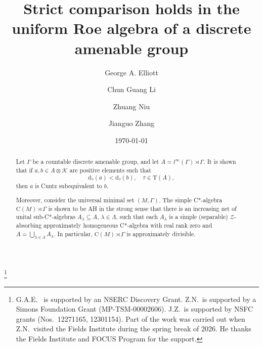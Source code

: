 \documentclass[12pt, oneside, psamsfonts]{amsart}
\theoremstyle{definition}
\theoremstyle{remark}
\numberwithin{equation}{section}
\newcommand{\tr}{\mathrm{T}}
\begin{document}
\title[Strict comparison in uniform Roe algebra]{Strict comparison holds in the uniform Roe algebra of a discrete amenable group}

\author{George A. Elliott}
\address{Department of Mathematics, University of Toronto, Toronto, Ontario, Canada~\ M5S 2E4}

\author{Chun Guang Li}
\address{
School of Mathematics and Statistics, Northeast Normal University, Changchun, 130024, P. R.~China
}

\author{Zhuang Niu}
\address{Department of Mathematics and Statistics, University of Wyoming, Laramie, Wyoming, USA, 82071}

\author{Jianguo Zhang}
\address{
School of Mathematics and Statistics, Shaanxi Normal University, Xi'an, Shaanxi, P. R.~China
}

\thanks{G.A.E.~ is supported by an NSERC Discovery Grant. Z.N.~is supported by a Simons Foundation Grant (MP-TSM-00002606). J.Z.~is supported by NSFC grants (Nos.~12271165, 12301154). Part of the work  was carried out when Z.N.~visited the Fields Institute during the spring break of 2026. He thanks the Fields Institute and FOCUS Program for the support.}
\date{\today}

\begin{abstract}
Let $\Gamma$ be a countable discrete amenable group, and let $A=l^\infty(\Gamma) \rtimes \Gamma$. It is shown that if $a, b \in A \otimes \mathcal K$ are positive elements such that $$\mathrm{d}_\tau(a) < \mathrm{d}_\tau(b),\quad \tau \in \tr(A),$$ then $a$ is Cuntz subequivalent to $b$. 

Moreover, consider the universal minimal set $(M, \Gamma)$.
%
The simple C*-algebra $\mathrm{C}(M)\rtimes\Gamma$ is shown to be AH in the strong sense that there is an increasing net of unital sub-C*-algebras $A_\lambda \subseteq A$, $\lambda \in \Lambda$, such that each $A_\lambda$ is a simple (separable) $\mathcal Z$-absorbing approximately homogeneous C*-algebra with real rank zero and $A = \bigcup_{\lambda \in \Lambda} A_\lambda$. In particular, $\mathrm{C}(M)\rtimes\Gamma$ is approximately divisible.
 
\end{abstract}
\end{document}
